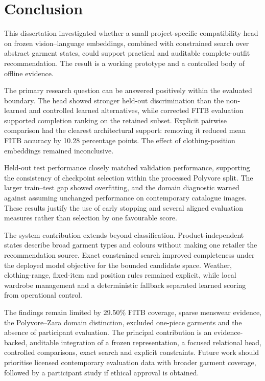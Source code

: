 \chapter{Conclusion}

This dissertation investigated whether a small project-specific compatibility
head on frozen vision--language embeddings, combined with constrained search
over abstract garment states, could support practical and auditable
complete-outfit recommendation. The result is a working prototype and a
controlled body of offline evidence.

The primary research question can be answered positively within the evaluated
boundary. The head showed stronger held-out discrimination than the non-learned
and controlled learned alternatives, while corrected FITB evaluation supported
completion ranking on the retained subset. Explicit pairwise comparison had the
clearest architectural support: removing it reduced mean FITB accuracy by
10.28 percentage points. The effect of clothing-position embeddings remained
inconclusive.

Held-out test performance closely matched validation performance, supporting
the consistency of checkpoint selection within the processed Polyvore split.
The larger train--test gap showed overfitting, and the
domain diagnostic warned against assuming unchanged performance on contemporary
catalogue images. These results justify the use of early stopping and several
aligned evaluation measures rather than selection by one favourable score.

The system contribution extends beyond classification. Product-independent
states describe broad garment types and colours without making one retailer the
recommendation source. Exact constrained search improved completeness under the
deployed model objective for the bounded candidate space. Weather,
clothing-range, fixed-item and position rules remained explicit, while local
wardrobe management and a deterministic fallback separated learned scoring from
operational control.

The findings remain limited by 29.50\% FITB coverage, sparse menswear evidence,
the Polyvore--Zara domain distinction, excluded one-piece garments and the
absence of participant evaluation. The principal contribution is an
evidence-backed, auditable integration of a frozen
representation, a focused relational head, controlled comparisons, exact
search and explicit constraints. Future work should prioritise licensed
contemporary evaluation data with broader garment coverage, followed by a
participant study if ethical approval is obtained.

